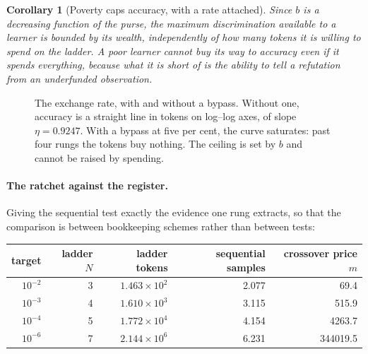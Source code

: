 \documentclass[11pt]{article}
\theoremstyle{plain}
\newtheorem{corollary}[theorem]{Corollary}
\theoremstyle{definition}
\theoremstyle{remark}
\begin{document}
\begin{corollary}[Poverty caps accuracy, with a rate attached]
Since $b$ is a decreasing function of the purse, the maximum discrimination
available to a learner is bounded by its wealth, independently of how many
tokens it is willing to spend on the ladder. A poor learner cannot buy its way
to accuracy even if it spends everything, because what it is short of is the
ability to tell a refutation from an underfunded observation.
\end{corollary}

\begin{figure}[t]
\centering
{}
\caption{The exchange rate, with and without a bypass. Without one, accuracy
is a straight line in tokens on log--log axes, of slope $\eta = 0.9247$. With
a bypass at five per cent, the curve saturates: past four rungs the tokens buy
nothing. The ceiling is set by $b$ and cannot be raised by spending.}
\label{fig:rate}
\end{figure}

\paragraph{The ratchet against the register.}
Giving the sequential test exactly the evidence one rung extracts, so that the
comparison is between bookkeeping schemes rather than between tests:

\begin{center}
\begin{tabular}{@{}rrrrr@{}}
\toprule
target & ladder $N$ & ladder tokens & sequential samples & crossover price $m$ \\
\midrule
$10^{-2}$ & 3 & $1.463\times10^{2}$ & 2.077 & 69.4 \\
$10^{-3}$ & 4 & $1.610\times10^{3}$ & 3.115 & 515.9 \\
$10^{-4}$ & 5 & $1.772\times10^{4}$ & 4.154 & 4263.7 \\
$10^{-6}$ & 7 & $2.144\times10^{6}$ & 6.231 & 344019.5 \\
\bottomrule
\end{tabular}
\end{center}
\end{document}
